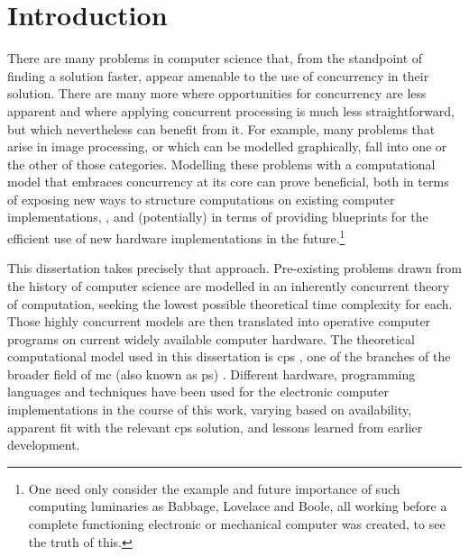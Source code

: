 \chapter{Introduction}

There are many problems in computer science that, from the standpoint of finding a solution faster, appear amenable to the use of concurrency in their solution.  There are many more where opportunities for concurrency are less apparent and where applying concurrent processing is much less straightforward, but which nevertheless can benefit from it.  For example, many problems that arise in image processing, or which can be modelled graphically, fall into one or the other of those categories.  Modelling these problems with a computational model that embraces concurrency at its core can prove beneficial, both in terms of exposing new ways to structure computations on existing computer implementations, \eg{} \cite{GimelFarb2013a,Nicolescu2014b}, and (potentially) in terms of providing blueprints for the efficient use of new hardware implementations in the future.\footnote{One need only consider the example and future importance of such computing luminaries as Babbage, Lovelace and Boole, all working before a complete functioning electronic or mechanical computer was created, to see the truth of this.}


This dissertation takes precisely that approach.  Pre-existing problems drawn from the history of computer science are modelled in an inherently concurrent theory of computation, seeking the lowest possible theoretical time complexity for each.  Those highly concurrent models are then translated into operative computer programs on current widely available computer hardware.  The theoretical computational model used in this dissertation is \gls{cps} \cite{Nicolescu2018}, one of the branches of the broader field of \gls{mc} (also known as \gls{ps}) \cite{Paun2010b,Paun2002}.  Different hardware, programming languages and techniques have been used for the electronic computer implementations in the course of this work, varying based on availability, apparent fit with the relevant \gls{cps} solution, and lessons learned from earlier development.

